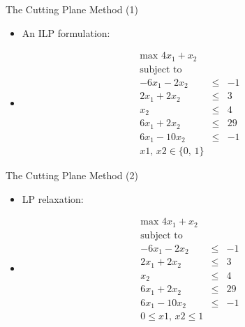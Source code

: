 \documentclass[10pt]{beamer}
\begin{document}
\begin{frame}[t]{The Cutting Plane Method (1)}
    \begin{itemize}
        \item<1-> An ILP formulation:
        \item<2->[ ]\begin{align}
             \text {max } \label{cp_obj} 4 x_1 + x_2 & &        \nonumber\\
             \text{subject to }             & & \nonumber       \nonumber\\
             \label{const:cp1}  -6x_1   -   2x_2   & \leq & -1  \nonumber\\
             \label{const:cp2}  2x_1    +   2x_2   & \leq & 3   \nonumber\\
             \label{const:cp3}              x_2    & \leq & 4   \nonumber\\
             \label{const:cp4}  6x_1    +   2x_2   & \leq & 29  \nonumber\\
             \label{const:cp5}  6x_1    -   10x_2  & \leq & -1  \nonumber\\     
             \label{const:cp6}  x1, \, x2 \in \{ 0, \, 1 \}     \nonumber
         \end{align}     
    \end{itemize}    
\end{frame}

\begin{frame}[t]{The Cutting Plane Method (2)}
    \begin{itemize}
        \item LP relaxation:
        \item[ ]\begin{align}
             \text {max } \label{cplp_obj} 4 x_1 + x_2 & &          \nonumber\\
             \text{subject to }             & &                     \nonumber\\
             \label{const:cplp1}  -6x_1   -   2x_2   & \leq & -1    \nonumber\\
             \label{const:cplp2}  2x_1    +   2x_2   & \leq & 3     \nonumber\\
             \label{const:cplp3}              x_2    & \leq & 4     \nonumber\\
             \label{const:cplp4}  6x_1    +   2x_2   & \leq & 29    \nonumber\\
             \label{const:cplp5}  6x_1    -   10x_2  & \leq & -1    \nonumber\\
             \label{const:cplp6}  0 \leq x1, \, x2 \leq 1           \nonumber
         \end{align}     
    \end{itemize}    
\end{frame}
\end{document}
